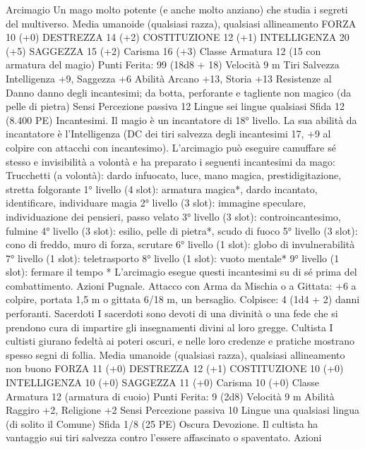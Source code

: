 \begin{multicols}{2}
Arcimagio
Un mago molto potente (e anche molto anziano) che
studia i segreti del multiverso.
Media umanoide (qualsiasi razza), qualsiasi allineamento
FORZA 10 (+0)
DESTREZZA 14 (+2)
COSTITUZIONE 12 (+1)
INTELLIGENZA 20 (+5)
SAGGEZZA 15 (+2)
Carisma 16 (+3)
Classe Armatura 12 (15 con armatura del magio)
\hspace*{0pt}\hfill{Punti Ferita}: 99 (18d8 + 18)
Velocità 9 m
Tiri Salvezza Intelligenza +9, Saggezza +6
Abilità Arcano +13, Storia +13
Resistenze al Danno danno degli incantesimi; da botta,
perforante e tagliente non magico (da pelle di pietra)
Sensi Percezione passiva 12
Lingue sei lingue qualsiasi
Sfida 12 (8.400 PE)
Incantesimi. Il magio è un incantatore di 18° livello. La sua
abilità da incantatore è l’Intelligenza (DC dei tiri salvezza degli
incantesimi 17, +9 al colpire con attacchi con incantesimo).
L’arcimagio può eseguire camuffare sé stesso e invisibilità a
volontà e ha preparato i seguenti incantesimi da mago:
Trucchetti (a volontà): dardo infuocato, luce, mano magica,
prestidigitazione, stretta folgorante
1° livello (4 slot): armatura magica*, dardo incantato,
identificare, individuare magia
2° livello (3 slot): immagine speculare, individuazione dei
pensieri, passo velato
3° livello (3 slot): controincantesimo, fulmine
4° livello (3 slot): esilio, pelle di pietra*, scudo di fuoco
5° livello (3 slot): cono di freddo, muro di forza, scrutare
6° livello (1 slot): globo di invulnerabilità
7° livello (1 slot): teletrasporto
8° livello (1 slot): vuoto mentale*
9° livello (1 slot): fermare il tempo
* L’arcimagio esegue questi incantesimi su di sé prima del
combattimento.
Azioni
Pugnale. Attacco con Arma da Mischia o a Gittata: +6 a colpire,
portata 1,5 m o gittata 6/18 m, un bersaglio.
Colpisce: 4 (1d4 + 2) danni perforanti.
Sacerdoti
I sacerdoti sono devoti di una divinità o una fede che si
prendono cura di impartire gli insegnamenti divini al loro
gregge.
Cultista
I cultisti giurano fedeltà ai poteri oscuri, e nelle loro
credenze e pratiche mostrano spesso segni di follia.
Media umanoide (qualsiasi razza), qualsiasi allineamento non
buono
FORZA 11 (+0)
DESTREZZA 12 (+1)
COSTITUZIONE 10 (+0)
INTELLIGENZA 10 (+0)
SAGGEZZA 11 (+0)
Carisma 10 (+0)
Classe Armatura 12 (armatura di cuoio)
\hspace*{0pt}\hfill{Punti Ferita}: 9 (2d8)
Velocità 9 m
Abilità Raggiro +2, Religione +2
Sensi Percezione passiva 10
Lingue una qualsiasi lingua (di solito il Comune)
Sfida 1/8 (25 PE)
Oscura Devozione. Il cultista ha vantaggio sui tiri salvezza
contro l’essere affascinato o spaventato.
Azioni

\end{multicols}
